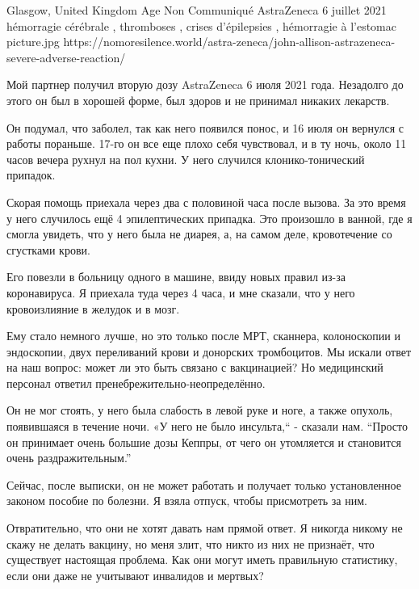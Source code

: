           {Glasgow, United Kingdom}
          {Age Non Communiqué}
          {AstraZeneca}
          {6 juillet 2021}
          {hémorragie cérébrale
            , thromboses
            , crises d'épilepsies
            , hémorragie à l'estomac}
          {picture.jpg}
          {https://nomoresilence.world/astra-zeneca/john-allison-astrazeneca-severe-adverse-reaction/}
          {

Мой партнер получил вторую дозу AstraZeneca 6 июля 2021 года. Незадолго до этого
он был в хорошей форме, был здоров и не принимал никаких лекарств.

Он подумал, что заболел, так как него появился понос, и 16 июля он вернулся с
работы пораньше. 17-го он все еще плохо себя чувствовал, и в ту ночь, около 11
часов вечера рухнул на пол кухни. У него случился клонико-тонический припадок.

Скорая помощь приехала через два с половиной часа после вызова. За это время у
него случилось ещё 4 эпилептических припадка. Это произошло в ванной, где я
смогла увидеть, что у него была не диарея, а, на самом деле, кровотечение со
сгустками крови.

Его повезли в больницу одного в машине, ввиду новых правил из-за коронавируса. Я
приехала туда через 4 часа, и мне сказали, что у него кровоизлияние в желудок и
в мозг.

Ему стало немного лучше, но это только после МРТ, сканнера, колоноскопии и
эндоскопии, двух переливаний крови и донорских тромбоцитов. Мы искали ответ на
наш вопрос: может ли это быть связано с вакцинацией? Но медицинский персонал
ответил пренебрежительно-неопределённо.

Он не мог стоять, у него была слабость в левой руке и ноге, а также опухоль,
появившаяся в течение ночи. «У него не было инсульта,“ - сказали нам. “Просто он
принимает очень большие дозы Кеппры, от чего он утомляется и становится очень
раздражительным.”

Сейчас, после выписки, он не может работать и получает только установленное
законом пособие по болезни. Я взяла отпуск, чтобы присмотреть за ним.

Отвратительно, что они не хотят давать нам прямой ответ. Я никогда никому не
скажу не делать вакцину, но меня злит, что никто из них не признаёт, что
существует настоящая проблема. Как они могут иметь правильную статистику, если
они даже не учитывают инвалидов и мертвых?

}
